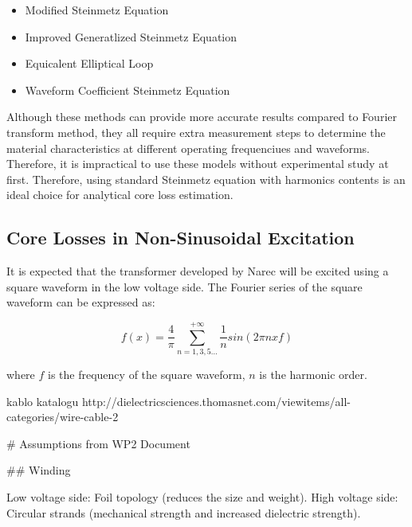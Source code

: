 \documentclass[a4paper, 11pt]{article} %
\begin{document}
\begin{itemize}
\item	Modified Steinmetz Equation
\item	Improved Generatlized Steinmetz Equation
\item	Equicalent Elliptical Loop
\item	Waveform Coefficient Steinmetz Equation
\end{itemize}

Although these methods can provide more accurate results compared to Fourier transform method, they all require extra measurement steps to determine the material characteristics at different operating frequenciues and waveforms. Therefore, it is impractical to use these models without experimental study at first. Therefore, using standard Steinmetz equation with harmonics contents is an ideal choice for analytical core loss estimation.

\subsection{Core Losses in Non-Sinusoidal Excitation}

It is expected that the transformer developed by Narec will be excited using a square waveform in the low voltage side. The Fourier series of the square waveform can be expressed as:

\begin{equation}
 f(x) = \frac{4}{\pi} \sum_{n=1,3,5...}^{+\infty} \frac{1}{n} sin ( 2 \pi n x f)
\end{equation}

where $f$ is the frequency of the square waveform, $n$ is the harmonic order.




kablo katalogu
http://dielectricsciences.thomasnet.com/viewitems/all-categories/wire-cable-2





# Assumptions from WP2 Document



## Winding

Low voltage side: Foil topology (reduces the size and weight).
High voltage side: Circular strands (mechanical strength and increased dielectric strength).
\end{document}
